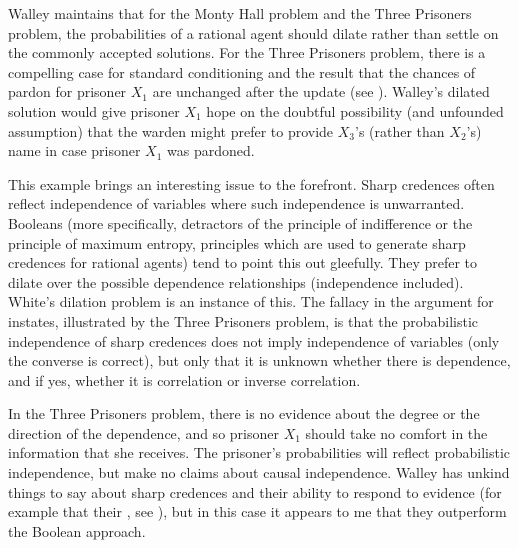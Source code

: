 \documentclass[11pt]{article}
\begin{document}
Walley maintains that for the Monty Hall problem and the Three
Prisoners problem, the probabilities of a rational agent should dilate
rather than settle on the commonly accepted solutions. For the Three
Prisoners problem, there is a compelling case for standard
conditioning and the result that the chances of pardon for prisoner
$X_{1}$ are unchanged after the update (see
). Walley's dilated solution would give
prisoner $X_{1}$ hope on the doubtful possibility (and unfounded
assumption) that the warden might prefer to provide $X_{3}$'s (rather
than $X_{2}$'s) name in case prisoner $X_{1}$ was pardoned.

This example brings an interesting issue to the forefront. Sharp
credences often reflect independence of variables where such
independence is unwarranted. Booleans (more specifically, detractors
of the principle of indifference or the principle of maximum entropy,
principles which are used to generate sharp credences for rational
agents) tend to point this out gleefully. They prefer to dilate over
the possible dependence relationships (independence included). White's
dilation problem is an instance of this. The fallacy in the argument
for instates, illustrated by the Three Prisoners problem, is that the
probabilistic independence of sharp credences does not imply
independence of variables (only the converse is correct), but only
that it is unknown whether there is dependence, and if yes, whether it
is correlation or inverse correlation.

In the Three Prisoners problem, there is no evidence about the degree
or the direction of the dependence, and so prisoner $X_{1}$ should
take no comfort in the information that she receives. The prisoner's
probabilities will reflect probabilistic independence, but make no
claims about causal independence. Walley has unkind things to say
about sharp credences and their ability to respond to evidence (for
example that their , see
), but in this case it appears to me that they
outperform the Boolean approach.

\end{document}
